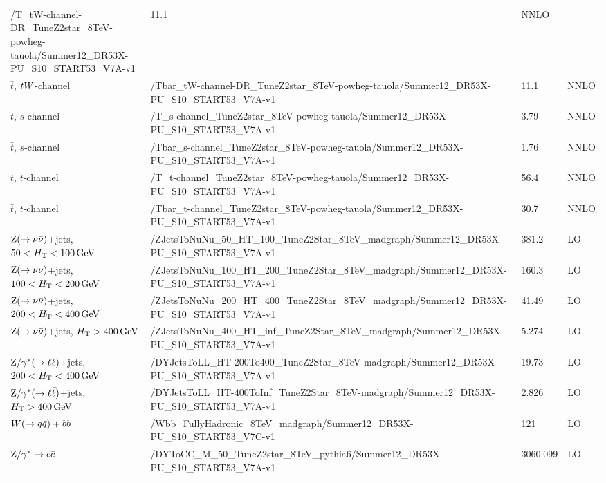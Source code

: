 \begin{table}
\begin{center}
\begin{tabular}{l l l l}
/T\_tW-channel-DR\_TuneZ2star\_8TeV-powheg-tauola/Summer12\_DR53X-PU\_S10\_START53\_V7A-v1 &
11.1 & NNLO \\
$\bar{t}$, $tW$-channel &
/Tbar\_tW-channel-DR\_TuneZ2star\_8TeV-powheg-tauola/Summer12\_DR53X-PU\_S10\_START53\_V7A-v1
& 11.1 & NNLO \\
$t$, $s$-channel &
/T\_s-channel\_TuneZ2star\_8TeV-powheg-tauola/Summer12\_DR53X-PU\_S10\_START53\_V7A-v1 & 3.79
& NNLO \\
$\bar{t}$, $s$-channel &
/Tbar\_s-channel\_TuneZ2star\_8TeV-powheg-tauola/Summer12\_DR53X-PU\_S10\_START53\_V7A-v1 &
1.76 & NNLO \\
$t$, $t$-channel &
/T\_t-channel\_TuneZ2star\_8TeV-powheg-tauola/Summer12\_DR53X-PU\_S10\_START53\_V7A-v1 & 56.4
& NNLO \\
$\bar{t}$, $t$-channel &
/Tbar\_t-channel\_TuneZ2star\_8TeV-powheg-tauola/Summer12\_DR53X-PU\_S10\_START53\_V7A-v1 &
30.7 & NNLO \\
\midrule
$\mathrm{Z} (\rightarrow \nu \bar{\nu})$+jets, $50 < H_{\mathrm{T}} < 100\,\text{Ge\hspace{-.08em}V}$ & 
/ZJetsToNuNu\_50\_HT\_100\_TuneZ2Star\_8TeV\_madgraph/Summer12\_DR53X-PU\_S10\_START53\_V7A-v1 
& 381.2 & LO \\
$\mathrm{Z} (\rightarrow \nu \bar{\nu})$+jets, $100 < H_{\mathrm{T}} < 200\,\text{Ge\hspace{-.08em}V}$ &
/ZJetsToNuNu\_100\_HT\_200\_TuneZ2Star\_8TeV\_madgraph/Summer12\_DR53X-PU\_S10\_START53\_V7A-v1 
& 160.3 & LO \\
$\mathrm{Z} (\rightarrow \nu \bar{\nu})$+jets, $200 < H_{\mathrm{T}} < 400\,\text{Ge\hspace{-.08em}V}$ &
/ZJetsToNuNu\_200\_HT\_400\_TuneZ2Star\_8TeV\_madgraph/Summer12\_DR53X-PU\_S10\_START53\_V7A-v1 
& 41.49 & LO \\
$\mathrm{Z} (\rightarrow \nu \bar{\nu})$+jets, $H_{\mathrm{T}} > 400\,\text{Ge\hspace{-.08em}V}$ &
/ZJetsToNuNu\_400\_HT\_inf\_TuneZ2Star\_8TeV\_madgraph/Summer12\_DR53X-PU\_S10\_START53\_V7A-v1 
& 5.274 & LO \\
\midrule
$\mathrm{Z}/\gamma^* (\rightarrow \ell \bar{\ell})$+jets, $200 < H_{\mathrm{T}} < 400\,\text{Ge\hspace{-.08em}V}$ &
/DYJetsToLL\_HT-200To400\_TuneZ2Star\_8TeV-madgraph/Summer12\_DR53X-PU\_S10\_START53\_V7A-v1
& 19.73 & LO \\
$\mathrm{Z}/\gamma^* (\rightarrow \ell \bar{\ell})$+jets, $H_{\mathrm{T}} > 400\,\text{Ge\hspace{-.08em}V}$ &
/DYJetsToLL\_HT-400ToInf\_TuneZ2Star\_8TeV-madgraph/Summer12\_DR53X-PU\_S10\_START53\_V7A-v1
& 2.826 & LO \\
\midrule
$W(\rightarrow q\bar{q})+bb$ & 
/Wbb\_FullyHadronic\_8TeV\_madgraph/Summer12\_DR53X-PU\_S10\_START53\_V7C-v1 & 121 & LO \\
$\mathrm{Z}/\gamma^*\rightarrow c\bar{c}$ & 
/DYToCC\_M\_50\_TuneZ2star\_8TeV\_pythia6/Summer12\_DR53X-PU\_S10\_START53\_V7A-v1 & 3060.099 & LO \\

\end{tabular}
\end{center}
\end{table}
